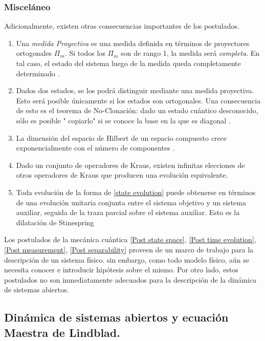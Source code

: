  \subsubsection{Misceláneo}
 Adicionalmente, existen otras consecuencias importantes de los postulados.
 
 \begin{enumerate}
     \item 
 Una \textit{medida Proyectiva} es una medida definida en términos de proyectores ortogonales $\Pi_{m}$. Si todos los $\Pi_m$ son de rango 1, la medida será \textit{completa}. En tal caso, el estado del sistema luego de la medida queda completamente determinado \cite{Nielsen.00}. 
 
 \item Dados dos estados, se los podrá distinguir mediante una medida proyectiva. Esto será posible únicamente si los estados son ortogonales. Una consecuencia de esto es el teorema de No-Clonación: dado un estado cuántico desconocido, sólo es posible " copiarlo" si se conoce la base en la que es diagonal \cite{Nielsen.00}.
 
 \item La dimensión del espacio de Hilbert de un espacio compuesto crece exponencialmente con el número de componentes .
 
 \item Dado un conjunto de operadores de Kraus, existen infinitas elecciones de otros operadores de Kraus que producen una evolución equivalente. 
 
 \item Toda evolución de la forma de \eqref{state evolution} puede obtenerse en términos de una evolución unitaria conjunta entre el sistema objetivo y un sistema auxiliar, seguida de la traza parcial sobre el sistema auxiliar. Esto es la dilatación de Stinespring \cite{Stinespring,KasparovabtSt.}
 \end{enumerate}
 
 
 Los postulados de la mecánica cuántica \ref{Post state space}, \ref{Post time evolution}, \ref{Post measurement}, \ref{Post separability} proveen de un marco de trabajo para la descripción de un sistema físico. sin embargo, como todo modelo físico, aún se necesita conocer e introducir hipótesis sobre el mismo. Por otro lado, estos postulados no son inmediatamente adecuados para la descripción de la dinámica de sistemas abiertos. 
 
\subsection{Dinámica de sistemas abiertos y ecuación Maestra de Lindblad.} 

